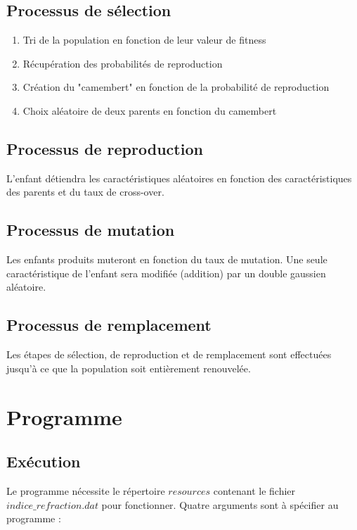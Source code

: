 \documentclass[a4paper,11pt]{article}
\begin{document}
\subsection{Processus de sélection}

\begin{enumerate}
\item Tri de la population en fonction de leur valeur de fitness
\item Récupération des probabilités de reproduction
\item Création du "camembert" en fonction de la probabilité de reproduction
\item Choix aléatoire de deux parents en fonction du camembert 
\end{enumerate}

\subsection{Processus de reproduction}

L'enfant détiendra les caractéristiques aléatoires en fonction des caractéristiques des parents et du taux de cross-over.

\subsection{Processus de mutation}

Les enfants produits muteront en fonction du taux de mutation. Une seule caractéristique de l'enfant sera modifiée (addition) par un double gaussien aléatoire.

\subsection{Processus de remplacement}

Les étapes de sélection, de reproduction et de remplacement sont effectuées jusqu'à ce que la population soit entièrement renouvelée.

\section{Programme}

\subsection{Exécution}

Le programme nécessite le répertoire $resources$ contenant le fichier $indice\_refraction.dat$ pour fonctionner.
Quatre arguments sont à spécifier au programme :
\end{document}
